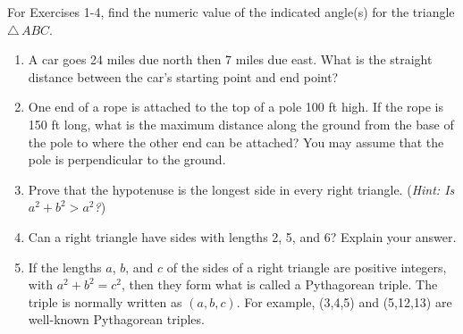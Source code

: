 \startexercises\label{sec1dot1}
\vspace{5mm}
{\small
\par\noindent For Exercises 1-4, find the numeric value of the indicated angle(s) for the
triangle $\triangle\,ABC$.
\begin{enumerate}[\bfseries 1.]
 For Exercises 5-8, find the numeric value of the indicated angle(s) for the right
 triangle $\triangle\,ABC$, with $C$ being the right angle.
 [{[\bfseries 1.]}]
 \item A car goes 24 miles due north then 7 miles due east. What is the straight distance between
 the car's starting point and end point?
 \item One end of a rope is attached to the top of a pole 100 ft high.
 If the rope is 150 ft long, what is the maximum distance along the
 ground from the base of the pole to where the other end can be attached? You may assume
 that the pole is perpendicular to the ground.
 \item\label{exer:hypo} Prove that the hypotenuse is the longest side in every right triangle.
 (\emph{Hint: Is $a^2 + b^2 > a^2$?})
 \item Can a right triangle have sides with lengths 2, 5, and 6? Explain your answer. 
 \item If the lengths $a$, $b$, and $c$ of the sides of a right triangle are positive integers, with  $a^2 + b^2 = c^2$, then they form what is called a Pythagorean triple. The triple is normally written as $(a,b,c)$. For example, (3,4,5) and (5,12,13) are well-known Pythagorean triples.

\end{enumerate}}
